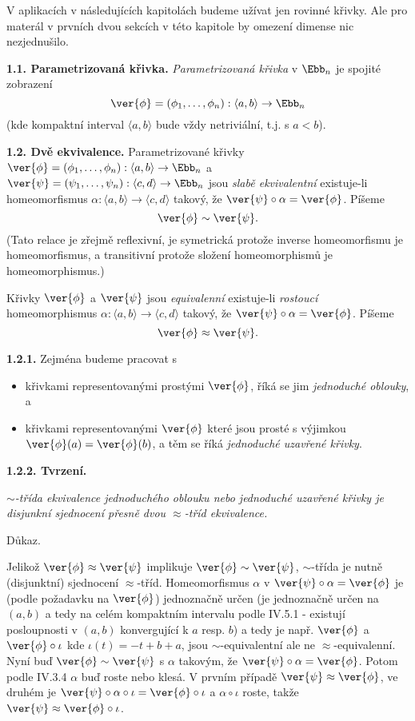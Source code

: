\documentclass[12pt]{article}
\begin{document}
 \bigskip 
 
V aplikacích v následujících kapitolách budeme užívat jen rovinné křivky. Ale pro materál v prvních dvou sekcích v této kapitole by omezení dimense nic nezjednušilo. 
 
\bigskip 
 
 {\bf 1.1. Parametrizovaná křivka.}  {\em Parametrizovaná křivka} v $\Ebb_n$ je spojité zobrazení
 $$
 \ver{\phi}=(\phi_1,\dots,\phi_n):\langle a,b\rangle\to\Ebb_n
 $$
(kde kompaktní interval  $\langle a,b\rangle$ bude vždy netriviální, t.j. s $a<b$).
 
 \bigskip  
 
 {\bf 1.2.  Dvě ekvivalence.} Parametrizované křivky $\ver{\phi}=(\phi_1,\dots,\phi_n):\langle a,b\rangle\to\Ebb_n$ a 
  $\ver{\psi}=(\psi_1,\dots,\psi_n):\langle c,d\rangle\to\Ebb_n$ jsou {\em slabě ekvivalentní} existuje-li homeomorfismus
   $\alpha:\langle a,b\rangle\to\langle c,d\rangle$ takový, že $\ver{\psi}\circ\alpha=\ver{\phi}$. Píšeme
  $$
  \ver{\phi}\sim\ver{\psi}.
  $$
  (Tato relace je zřejmě reflexivní, je symetrická protože inverse homeomorfismu je homeomorfismus, a transitivní protože složení homeomorphismů je homeomorphismus.)
  
  Křivky
  $\ver{\phi}$ a
  $\ver{\psi}$ jsou {\em equivalenní} existuje-li
   {\em rostoucí}  homeomorphismus $\alpha:\langle a,b\rangle\to\langle c,d\rangle$ takový, že $\ver{\psi}\circ\alpha=\ver{\phi}$. Píšeme
  $$
  \ver{\phi}\approx\ver{\psi}.
  $$
	
	\medskip
	
	{\bf 1.2.1.} Zejména budeme pracovat s
	\begin{itemize}
	\item křivkami representovanými prostými $\ver{\phi}$, říká se jim {\em jednoduché oblouky}, a
	\item křivkami representovanými $\ver{\phi}$ které jsou prosté s výjimkou $\ver{\phi}(a)=\ver{\phi}(b)$, a těm se říká {\em jednoduché uzavřené křivky}.
	\end{itemize}
  
  \medskip
  
  {\bf 1.2.2. Tvrzení.} {\em $\sim$-třída ekvivalence jednoduchého oblouku nebo jednoduché uzavřené křivky
	je disjunkní sjednocení přesně dvou 
   $\approx$-tříd ekvivalence.
  
  Důkaz.} Jelikož $\ver{\phi}\approx\ver{\psi}$ implikuje $\ver{\phi}\sim\ver{\psi}$,  $\sim$-třída je nutně (disjunktní) sjednocení $\approx$-tříd. Homeomorfismus $\alpha$ v $\ver{\psi}\circ\alpha=\ver{\phi}$ je (podle požadavku na $\ver{\phi}$) jednoznačně určen (je jednoznačně určen na $(a,b)$ a tedy na celém kompaktním intervalu podle IV.5.1 - existují posloupnosti v $(a,b)$ konvergující k $a$ resp. $b$) a tedy je např. $\ver{\phi}$ a  $\ver{\phi}\circ\iota$ kde $\iota(t)=-t+b+a$, jsou $\sim$-equivalentní ale ne  $\approx$-equivalenní. Nyní buď $\ver{\phi}\sim\ver{\psi}$ s $\alpha$ takovým, že $\ver{\psi}\circ\alpha=\ver{\phi}$. Potom podle IV.3.4 $\alpha$ buď roste nebo klesá. V prvním případě $\ver{\psi}\approx\ver{\phi}$, ve druhém je 
  $\ver{\psi}\circ\alpha\circ\iota=\ver{\phi}\circ\iota$ a $\alpha\circ\iota$ roste, takže $\ver{\psi}\approx\ver{\phi}\circ\iota$.\sq
  
\end{document}
